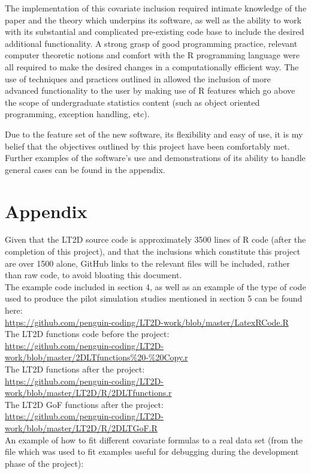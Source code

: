 \documentclass[11pt]{article}
\begin{document}
\begin{multicols}{2}
The implementation of this covariate inclusion required intimate knowledge of the \cite{Borchers} paper and the theory which underpins its software, as well as the ability to work with its substantial and complicated pre-existing code base to include the desired additional functionality. A strong grasp of good programming practice, relevant computer theoretic notions and comfort with the R programming language were all required to make the desired changes in a computationally efficient way. The use of techniques and practices outlined in \cite{Hadley} allowed the inclusion of more advanced functionality to the user by making use of R features which go above the scope of undergraduate statistics content (such as object oriented programming, exception handling, etc). 

Due to the feature set of the new software, its flexibility and easy of use, it is my belief that the objectives outlined by this project have been comfortably met. Further examples of the software's use and demonstrations of its ability to handle general cases can be found in the appendix.



\end{multicols}

\section{Appendix}

Given that the LT2D source code is approximately 3500 lines of R code (after the completion of this project), and that the inclusions which constitute this project are over 1500 alone, GitHub links to the relevant files will be included, rather than raw code, to avoid bloating this document.\\

The example code included in section 4, as well as an example of the type of code used to produce the pilot simulation studies mentioned in section 5 can be found here: 
\\
\url{https://github.com/penguin-coding/LT2D-work/blob/master/LatexRCode.R}\\

The LT2D functions code before the project:
\\\url{https://github.com/penguin-coding/LT2D-work/blob/master/2DLTfunctions\%20-\%20Copy.r}\\

The LT2D functions after the project:\\\url{
https://github.com/penguin-coding/LT2D-work/blob/master/LT2D/R/2DLTfunctions.r}\\

The LT2D GoF functions after the project:\\
\url{https://github.com/penguin-coding/LT2D-work/blob/master/LT2D/R/2DLTGoF.R}\\

An example of how to fit different covariate formulas to a real data set (from the file which was used to fit examples useful for debugging during the development phase of the project):\\
\end{document}
